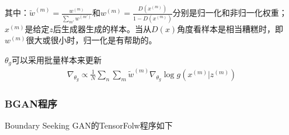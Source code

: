             其中：$\tilde{w}^{(m)} = \frac{w^{(m)}}{\sum_{m'}w^{(m')}}$和$w^{(m)} = \frac{D(x^{(m)})}{1-D(x^{(m)})}$分别是归一化和非归一化权重；$x^{(m)}$是给定$z$后生成器生成的样本。当从$D(x)$角度看样本是相当糟糕时，即$w^{(m)}$很大或很小时，归一化是有帮助的。
            \par
            $\theta_g$可以采用批量样本来更新
            \begin{align*}
            \nabla_{\theta_g} \propto \frac{1}{N} \sum_n\sum _m \tilde{w}^{(m)} \nabla_{\theta_g} \log g(x^{(m)}|z^{(m)})
            \end{align*}

        \subsubsection{BGAN程序}
            \par
            Boundary Seeking GAN的TensorFolw程序如下
